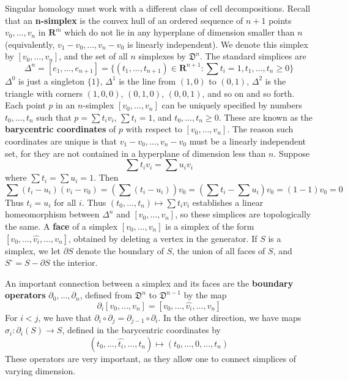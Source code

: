 Singular homology must work with a different class of cell decompositions. Recall that an {\bf n-simplex} is the convex hull of an ordered sequence of $n+1$ points $v_0, \dots, v_n$ in $\mathbf{R}^m$ which do not lie in any hyperplane of dimension smaller than $n$ (equivalently, $v_1 - v_0, \dots, v_n - v_0$ is linearly independent). We denote this simplex by $[v_0, \dots, v_n]$, and the set of all $n$ simplexes by $\mathfrak{D}^n$. The standard simplices are
%
\[ \Delta^n = [e_1, \dots, e_{n+1}] = \{ (t_1, \dots, t_{n+1}) \in \mathbf{R}^{n+1} : \sum t_i = 1, t_1, \dots, t_n \geq 0 \} \]
%
$\Delta^0$ is just a singleton $\{ 1 \}$, $\Delta^1$ is the line from $(1,0)$ to $(0,1)$, $\Delta^2$ is the triangle with corners $(1,0,0)$, $(0,1,0)$, $(0,0,1)$, and so on and so forth. Each point $p$ in an $n$-simplex $[v_0, \dots, v_n]$ can be uniquely specified by numbers $t_0, \dots, t_n$ such that $p = \sum t_i v_i$, $\sum t_i = 1$, and $t_0, \dots, t_n \geq 0$. These are known as the {\bf barycentric coordinates} of $p$ with respect to $[v_0, \dots, v_n]$. The reason such coordinates are unique is that $v_1 - v_0, \dots, v_n - v_0$ must be a linearly independent set, for they are not contained in a hyperplane of dimension less than $n$. Suppose
%
\[ \sum t_i v_i  = \sum u_i v_i \]
%
where $\sum t_i = \sum u_i = 1$. Then
%
\[ \sum (t_i - u_i) (v_i - v_0) = \left( \sum (t_i - u_i) \right) v_0 = \left( \sum t_i - \sum u_i \right) v_0 = (1 - 1) v_0 = 0 \]
%
Thus $t_i = u_i$ for all $i$. Thus $(t_0, \dots, t_n) \mapsto \sum t_i v_i$ establishes a linear homeomorphism between $\Delta^n$ and $[v_0, \dots, v_n]$, so these simplices are topologically the same. A {\bf face} of a simplex $[v_0, \dots, v_n]$ is a simplex of the form $[v_0, \dots, \widehat{v_i}, \dots, v_n]$, obtained by deleting a vertex in the generator. If $S$ is a simplex, we let $\partial S$ denote the boundary of $S$, the union of all faces of $S$, and $S^\circ = S - \partial S$ the interior.

An important connection between a simplex and its faces are the {\bf boundary operators} $\partial_0, \dots, \partial_n$, defined from $\mathfrak{D}^n$ to $\mathfrak{D}^{n-1}$ by the map
%
\[ \partial_i [v_0, \dots, v_n] = [v_0, \dots, \widehat{v_i}, \dots, v_n] \]
%
For $i < j$, we have that $\partial_i \circ \partial_j = \partial_{j-1} \circ \partial_i$. In the other direction, we have maps $\sigma_i: \partial_i(S) \to S$, defined in the barycentric coordinates by
%
\[ (t_0, \dots, \widehat{t_i}, \dots, t_n) \mapsto (t_0, \dots, 0, \dots, t_n) \]
%
These operators are very important, as they allow one to connect simplices of varying dimension.

